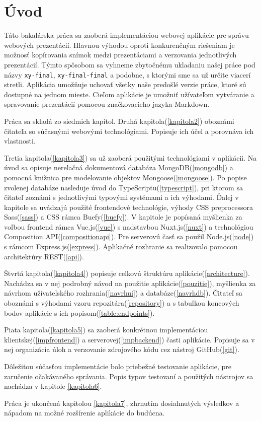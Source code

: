 \chapter{Úvod}
Táto bakalárska práca sa zaoberá implementáciou webovej aplikácie pre správu webových prezentácií. Hlavnou výhodou oproti konkurenčným riešeniam je možnosť kopírovania snímok medzi prezentáciami a verzovania jednotlivých prezentácií. Týmto spôsobom sa vyhneme zbytočnému ukladaniu našej práce pod názvy \texttt{xy-final}, \texttt{xy-final-final} a podobne, s ktorými sme sa už určite viacerí stretli. Aplikácia umožňuje uchovať všetky naše predošlé verzie práce, ktoré sú dostupné na jednom mieste. Cieľom aplikácie je umožniť užívateľom vytváranie a spravovanie prezentácií pomocou značkovacieho jazyka Markdown.

Práca sa skladá zo siedmich kapitol. Druhá kapitola(\ref{kapitola2}) oboznámi čitateľa so súčasnými webovými technológiami. Popisuje ich účel a porovnáva ich vlastnosti. 

Tretia kapitola(\ref{kapitola3}) sa už zaoberá použitými technológiami v aplikácii. Na úvod sa opisuje nerelačná dokumentová databáza MongoDB(\ref{mongodb}) a pomocná knižnica pre modelovanie objektov Mongoose(\ref{mongoose}). Po popise zvolenej databáze nasleduje úvod do TypeScriptu(\ref{typescript}), pri ktorom sa čitateľ zoznámi s jednotlivými typovými systémami a ich výhodami. Ďalej v kapitole sa uvádzajú použité frontendové technológie, výhody CSS preprocessora Sass(\ref{sass}) a CSS rámca Buefy(\ref{buefy}). V kapitole je popísaná myšlienka za voľbou frontend rámca Vue.js(\ref{vue}) s nadstavbou Nuxt.js(\ref{nuxt}) a technológiou Composition API(\ref{compositionapi}). Pre serverovú časť sa použil Node.js(\ref{node}) s rámcom Express.js(\ref{express}). Aplikačné rozhranie sa realizovalo pomocou architektúry REST(\ref{api}).

Štvrtá kapitola(\ref{kapitola4}) popisuje celkovú štruktúru aplikácie(\ref{architecture}). Nachádza sa v nej podrobný návod na použitie aplikácie(\ref{pouzitie}), myšlienka za návrhom užívateľského rozhrania(\ref{navrhui}) a databáze(\ref{navrhdb}). Čitateľ sa oboznámi s výhodami vzoru repozitára(\ref{repository}) a s tabuľkou koncových bodov aplikácie s ich popisom(\ref{table:endpoints}).

Piata kapitola(\ref{kapitola5}) sa zaoberá konkrétnou implementáciou klientskej(\ref{impfrontend}) a serverovej(\ref{impbackend}) časti aplikácie. Popisuje sa v nej organizácia úloh a verzovanie zdrojového kódu cez nástroj GitHub(\ref{git}).

Dôležitou súčasťou implementácie bolo priebežné testovanie aplikácie, pre zaručenie očakávaného správania. Popis typov testovaní a použitých nástrojov sa nachádza v kapitole \ref{kapitola6}.

Práca je ukončená kapitolou \ref{kapitola7}, zhrnutím dosiahnutých výsledkov a nápadom na možné rozšírenie aplikácie do budúcna. 